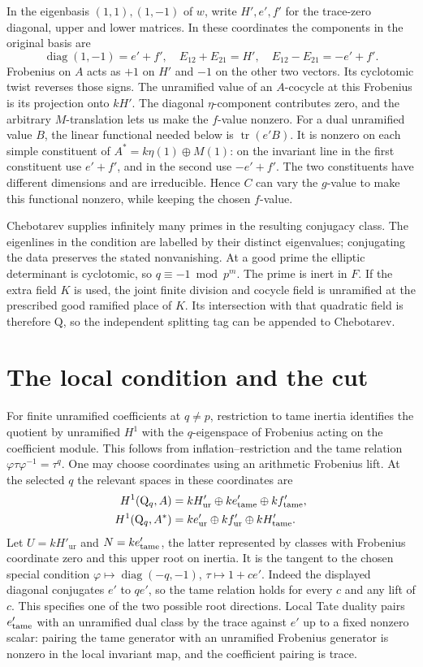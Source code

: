 \documentclass[11pt]{article}
\newcommand{\Q}{\mathrm{Q}}
\newcommand{\unr}{\mathrm{ur}}
\begin{document}
In the eigenbasis $(1,1),(1,-1)$ of $w$, write $H',e',f'$ for the
trace-zero diagonal, upper and lower matrices. In these coordinates
the components in the original basis are
\[
 \operatorname{diag}(1,-1)=e'+f',\quad
 E_{12}+E_{21}=H',\quad E_{12}-E_{21}=-e'+f'.
\]
Frobenius on $A$ acts as $+1$ on $H'$ and $-1$ on the other two
vectors. Its cyclotomic twist reverses those signs. The unramified
value of an $A$-cocycle at this Frobenius is its projection onto
$kH'$. The diagonal $\eta$-component contributes zero, and the
arbitrary $M$-translation lets us make the $f$-value nonzero.
For a dual unramified value $B$, the linear functional needed
below is $\operatorname{tr}(e'B)$. It is nonzero on each simple
constituent of $A^*=k\eta(1)\oplus M(1)$: on the invariant line
in the first constituent use $e'+f'$, and in the second use
$-e'+f'$. The two constituents have different dimensions and are
irreducible. Hence $C$ can vary the $g$-value to make this functional
nonzero, while keeping the chosen $f$-value.

Chebotarev supplies infinitely many primes in the resulting conjugacy
class. The eigenlines in the condition are labelled by their distinct
eigenvalues; conjugating the data preserves the stated nonvanishing.
At a good prime the elliptic determinant is cyclotomic, so
$q\equiv-1\bmod p^m$. The prime is inert in $F$. If the extra field
$K$ is used, the joint finite division and cocycle field is
unramified at the prescribed good ramified place of $K$. Its
intersection with that quadratic field is therefore $\Q$,
so the independent splitting tag can be appended to Chebotarev.

\section{The local condition and the cut}
For finite unramified coefficients at $q\ne p$, restriction to tame
inertia identifies the quotient by unramified $H^1$ with the
$q$-eigenspace of Frobenius acting on the coefficient module.
This follows from inflation--restriction and the tame relation
$\varphi\tau\varphi^{-1}=\tau^q$. One may choose coordinates
using an arithmetic Frobenius lift. At the selected $q$ the relevant
spaces in these coordinates are
\[
 \begin{split}
 H^1(\Q_q,A)&= kH'_{\unr}\oplus k e'_{\rm tame}\oplus k f'_{\rm tame},\\
 H^1(\Q_q,A^*)&= k e'_{\unr}\oplus k f'_{\unr}\oplus kH'_{\rm tame}.
 \end{split}
\]
Let $U=kH'_{\unr}$ and $N=k e'_{\rm tame}$, the latter represented
by classes with Frobenius coordinate zero and this upper root on
inertia. It is the tangent to the chosen special condition
$\varphi\mapsto\operatorname{diag}(-q,-1)$,
$\tau\mapsto1+c e'$. Indeed the displayed diagonal conjugates $e'$
to $q e'$, so the tame relation holds for every $c$ and any lift
of $c$. This specifies one of the two possible root directions.
Local Tate duality pairs $e'_{\rm tame}$ with an unramified dual
class by the trace against $e'$ up to a fixed nonzero scalar:
pairing the tame generator with an unramified Frobenius generator
is nonzero in the local invariant map, and the coefficient pairing
is trace.
\end{document}
